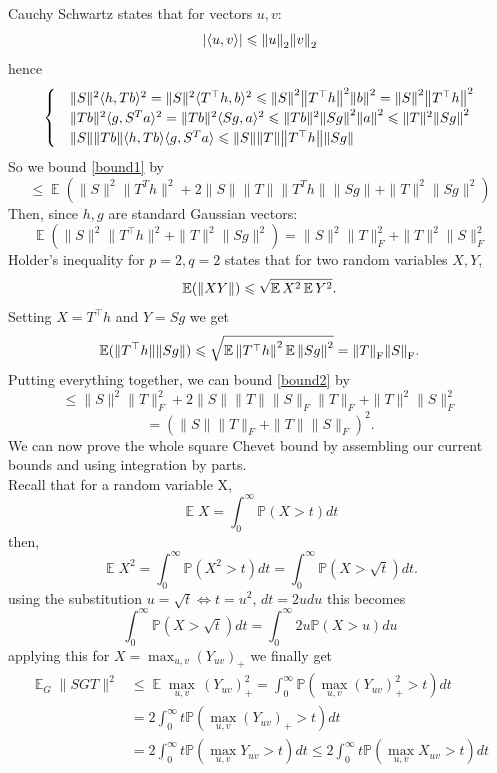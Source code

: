\documentclass[12pt,letterpaper]{article}
\newcommand{\E}{\Expect}
\renewcommand{\P}{\mathbb{P}}
\renewcommand{\le}{\leqslant}
\newcommand{\normsq}[1]{\norm{#1}^2}
\newcommand{\fnorm}[1]{\norm{#1}_{\mathrm{F}}}
\newcommand{\snorm}[1]{\norm{#1}_2}
\newcommand{\Expect}{\operatorname{\mathbb{E}}}
\begin{document}
\begin{enumerate}
Cauchy Schwartz states that for vectors $u,v$:
$$
\abs{\langle u,v\rangle} \le \snorm{u}\snorm{v}
$$
hence
$$
\begin{cases}
    & \|S\|^2\langle h,Tb \rangle^2 
    = \|S\|^2\langle T^\top h,b \rangle^2 
    \le \norm{S}^2 \normsq{T^\top h}\normsq{b}
    =\norm{S}^2 \normsq{T^\top h}\\
    & \|Tb\|^2\langle g,S^{T}a\rangle^2 =
    \|Tb\|^2\langle Sg,a\rangle^2 \le 
    \|Tb\|^2 \normsq{Sg}\normsq{a}\le 
    \|T\|^2 \normsq{Sg}\\
    &\|S\| \|Tb\| \langle h,Tb \rangle\langle g,S^{T}a\rangle \le
    \|S\| \|T\|\norm{T^\top h}\norm{Sg}
\end{cases}
$$
So we bound \autoref{bound1} by 
\begin{equation}
    \label{bound2}
    \le 
    \E\left(\|S\|^{2}\|T^{T}h\|^{2}+2\|S\|\|T\|\|T^{T}h\|\|Sg\|+\|T\|^{2}\|Sg\|^{2}\right)
\end{equation}
Then, since $h,g$ are standard Gaussian vectors:
$$
\E\left(\|S\|^{2}\|T^{\top}h\|^{2}+\|T\|^{2}\|Sg\|^{2}\right) = 
\|S\|^{2}\|T\|^{2}_F+\|T\|^{2}\|S\|^{2}_F
$$
Holder's inequality for $p=2,q=2$ states that for two random variables $X,Y$,
$$
\E (\norm{XY}) \le \sqrt{\E{X^2}\E{Y^2}}.
$$
Setting $X = T^\top h$ and $Y = Sg$ we get
$$
\E(\|T^{\top}h\|\|Sg\|) \le \sqrt{\E{\normsq{T^\top h}}\E{\normsq{Sg}}}
=
\fnorm{T}\fnorm{S}.
$$
Putting everything together, we can bound \autoref{bound2} by 
$$
\le 
\|S\|^{2}\|T\|^{2}_{F}+2\|S\|\|T\|\|S\|_{F}\|T\|_{F}+\|T\|^{2}\|S\|_{F}^{2} 
$$
$$
= (\|S\|\|T\|_{F}+\|T\|\|S\|_{F})^{2}.
$$
We can now prove the whole square Chevet bound by assembling our current bounds and using integration by parts.\\
Recall that for a random variable X,
$$
\E X = \int^{\infty}_{0}\P\left(X>t\right)dt
$$
then,
$$
\Expect X^2 = \int^{\infty}_{0}\P\left(X^2>t\right)dt = 
\int^{\infty}_{0}\P\left(X>\sqrt{t}\right)dt.
$$
using the substitution $u = \sqrt{t} \Leftrightarrow t = u^2$, $dt = 2udu$ this becomes
$$
\int^{\infty}_{0}\P\left(X>\sqrt{t}\right)dt
=
\int^{\infty}_{0}2u\P\left(X>u\right)du
$$
applying this for $X = \max_{u,v}(Y_{uv})_{+}$ we finally get 
\begin{align*}
\E_{G}\|SGT\|^{2}
&\leq \E\max_{u,v}\hspace{2pt} (Y_{uv})^{2}_{+} 
= \int^{\infty}_{0}\P\left(\max_{u,v}(Y_{uv})_{+}^2>t\right)dt
\\
&= 2\int^{\infty}_{0}t\P\left(\max_{u,v}(Y_{uv})_{+}>t\right)dt\\
&= 2\int^{\infty}_{0}t\P\left(\max_{u,v}Y_{uv}>t\right)dt \leq 2\int^{\infty}_{0}t\P\left(\max_{u,v}X_{uv}>t\right)dt \\

\end{align*}
\end{enumerate}
\end{document}
